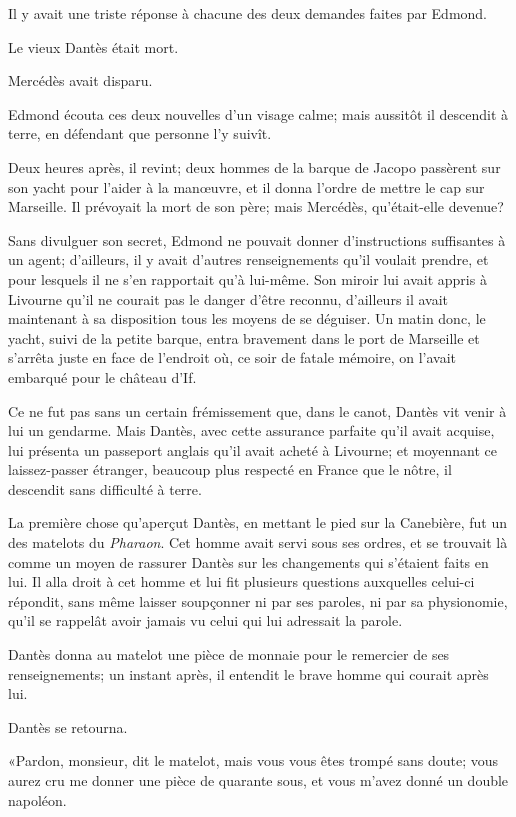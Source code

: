 Il y avait une triste réponse à chacune des deux demandes faites par Edmond.

Le vieux Dantès était mort.

Mercédès avait disparu.

Edmond écouta ces deux nouvelles d'un visage calme; mais aussitôt il descendit à terre, en défendant que personne l'y suivît.

Deux heures après, il revint; deux hommes de la barque de Jacopo passèrent sur son yacht pour l'aider à la manœuvre, et il donna l'ordre de mettre le cap sur Marseille. Il prévoyait la mort de son père; mais Mercédès, qu'était-elle devenue?

Sans divulguer son secret, Edmond ne pouvait donner d'instructions suffisantes à un agent; d'ailleurs, il y avait d'autres renseignements qu'il voulait prendre, et pour lesquels il ne s'en rapportait qu'à lui-même. Son miroir lui avait appris à Livourne qu'il ne courait pas le danger d'être reconnu, d'ailleurs il avait maintenant à sa disposition tous les moyens de se déguiser. Un matin donc, le yacht, suivi de la petite barque, entra bravement dans le port de Marseille et s'arrêta juste en face de l'endroit où, ce soir de fatale mémoire, on l'avait embarqué pour le château d'If.

Ce ne fut pas sans un certain frémissement que, dans le canot, Dantès vit venir à lui un gendarme. Mais Dantès, avec cette assurance parfaite qu'il avait acquise, lui présenta un passeport anglais qu'il avait acheté à Livourne; et moyennant ce laissez-passer étranger, beaucoup plus respecté en France que le nôtre, il descendit sans difficulté à terre.

La première chose qu'aperçut Dantès, en mettant le pied sur la Canebière, fut un des matelots du \textit{Pharaon}. Cet homme avait servi sous ses ordres, et se trouvait là comme un moyen de rassurer Dantès sur les changements qui s'étaient faits en lui. Il alla droit à cet homme et lui fit plusieurs questions auxquelles celui-ci répondit, sans même laisser soupçonner ni par ses paroles, ni par sa physionomie, qu'il se rappelât avoir jamais vu celui qui lui adressait la parole.

Dantès donna au matelot une pièce de monnaie pour le remercier de ses renseignements; un instant après, il entendit le brave homme qui courait après lui.

Dantès se retourna.

«Pardon, monsieur, dit le matelot, mais vous vous êtes trompé sans doute; vous aurez cru me donner une pièce de quarante sous, et vous m'avez donné un double napoléon.

